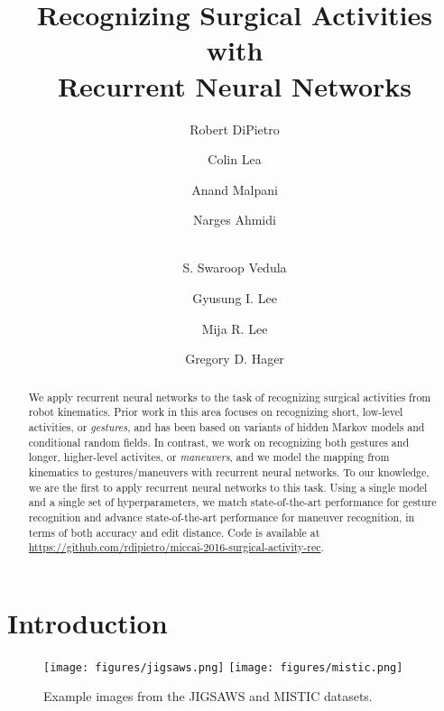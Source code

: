 \documentclass{llncs}
\begin{document}
\title{Recognizing Surgical Activities with\\Recurrent Neural Networks}

\author{Robert DiPietro \and
	    Colin Lea \and
	    Anand Malpani \and
	    Narges Ahmidi \and\\
	    S. Swaroop Vedula \and
	    Gyusung I. Lee \and
	    Mija R. Lee \and
	    Gregory D. Hager}
	    





\maketitle



\begin{abstract}
We apply recurrent neural networks to the task of recognizing surgical activities from robot kinematics. Prior work in this area focuses on recognizing short, low-level activities, or \emph{gestures}, and has been based on variants of hidden Markov models and conditional random fields. In contrast, we work on recognizing both gestures and longer, higher-level activites, or \emph{maneuvers}, and we model the mapping from kinematics to gestures/maneuvers with recurrent neural networks. To our knowledge, we are the first to apply recurrent neural networks to this task. Using a single model and a single set of hyperparameters, we match state-of-the-art performance for gesture recognition and advance state-of-the-art performance for maneuver recognition, in terms of both accuracy and edit distance. Code is available at \url{https://github.com/rdipietro/miccai-2016-surgical-activity-rec}.
\end{abstract}

\setcounter{footnote}{0}

\section{Introduction} \label{sec:introduction}

\begin{figure}[t]
	\centering
	\texttt{[image: figures/jigsaws.png]} \qquad
	\texttt{[image: figures/mistic.png]}
	\caption{Example images from the JIGSAWS and MISTIC datasets.}
	\label{fig:jigsaws}
\end{figure}
\end{document}
